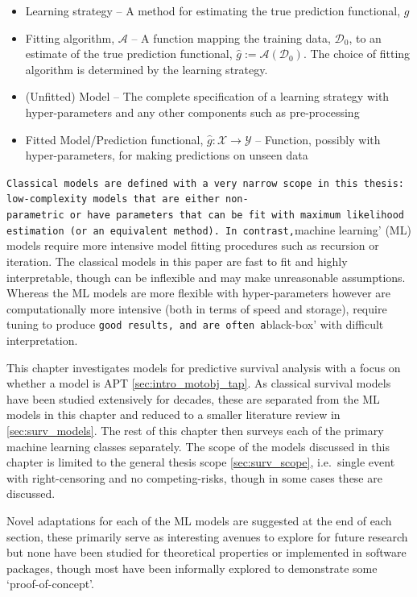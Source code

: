 \documentclass[
  letterpaper,
]{scrbook}
\providecommand{\tightlist}{%
  \setlength{\itemsep}{0pt}\setlength{\parskip}{0pt}}\usepackage{longtable,booktabs,array}
\theoremstyle{plain}
\theoremstyle{definition}
\theoremstyle{remark}
\begin{document}
\begin{itemize}
\tightlist
\item
  Learning strategy -- A method for estimating the true prediction
  functional, \(g\)
\item
  Fitting algorithm, \(\mathcal{A}\) -- A function mapping the training
  data, \(\mathcal{D}_0\), to an estimate of the true prediction
  functional, \(\hat{g}:= \mathcal{A}(\mathcal{D}_0)\). The choice of
  fitting algorithm is determined by the learning strategy.
\item
  (Unfitted) Model -- The complete specification of a learning strategy
  with hyper-parameters and any other components such as pre-processing
\item
  Fitted Model/Prediction functional,
  \(\hat{g}: \mathcal{X}\rightarrow \mathcal{Y}\) -- Function, possibly
  with hyper-parameters, for making predictions on unseen data
\end{itemize}

\noindent \texttt{Classical\textquotesingle{}\ models\ are\ defined\ with\ a\ very\ narrow\ scope\ in\ this\ thesis:\ low-complexity\ models\ that\ are\ either\ non-parametric\ or\ have\ parameters\ that\ can\ be\ fit\ with\ maximum\ likelihood\ estimation\ (or\ an\ equivalent\ method).\ In\ contrast,}machine
learning' (ML) models require more intensive model fitting procedures
such as recursion or iteration. The classical models in this paper are
fast to fit and highly interpretable, though can be inflexible and may
make unreasonable assumptions. Whereas the ML models are more flexible
with hyper-parameters however are computationally more intensive (both
in terms of speed and storage), require tuning to produce
\texttt{good\textquotesingle{}\ results,\ and\ are\ often\ a}black-box'
with difficult interpretation.

This chapter investigates models for predictive survival analysis with a
focus on whether a model is APT \ref{sec:intro_motobj_tap}. As classical
survival models have been studied extensively for decades, these are
separated from the ML models in this chapter and reduced to a smaller
literature review in \ref{sec:surv_models}. The rest of this chapter
then surveys each of the primary machine learning classes separately.
The scope of the models discussed in this chapter is limited to the
general thesis scope \ref{sec:surv_scope}, i.e.~single event with
right-censoring and no competing-risks, though in some cases these are
discussed.

Novel adaptations for each of the ML models are suggested at the end of
each section, these primarily serve as interesting avenues to explore
for future research but none have been studied for theoretical
properties or implemented in software packages, though most have been
informally explored to demonstrate some `proof-of-concept'.
\end{document}
